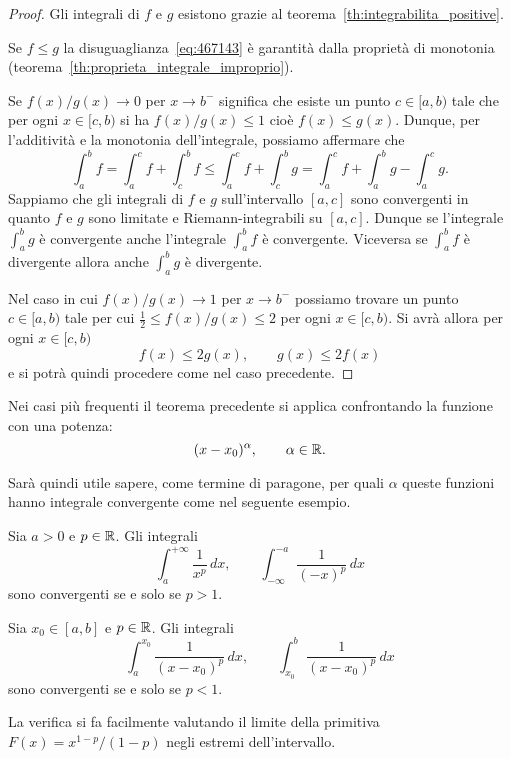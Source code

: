 \begin{proof}
\mymark{**}
Gli integrali di $f$ e $g$ esistono grazie al teorema~\ref{th:integrabilita_positive}.

Se $f\le g$ la disuguaglianza~\eqref{eq:467143} è garantità dalla proprietà di monotonia
(teorema~\ref{th:proprieta_integrale_improprio}).

Se $f(x)/g(x) \to 0$ per $x\to b^-$ significa che esiste un punto $c\in[a,b)$
tale che per ogni $x\in [c,b)$ si ha $f(x)/g(x)\le 1$ cioè $f(x)\le g(x)$.
Dunque, per l'additività e la monotonia dell'integrale, possiamo affermare che
\[
  \int_a^b f
  = \int_a^c f + \int_c^b f
  \le \int_a^c f + \int_c^b g
  = \int_a^c f + \int_a^b g - \int_a^c g.
\]
Sappiamo che gli integrali di $f$ e $g$ sull'intervallo
$[a,c]$ sono convergenti in quanto $f$ e $g$ sono
limitate e Riemann-integrabili su $[a,c]$.
Dunque se l'integrale $\int_a^b g$ è convergente anche l'integrale
$\int_a^b f$ è convergente.
Viceversa se $\int_a^b f$ è divergente allora anche $\int_a^b g$ è divergente.

Nel caso in cui $f(x)/g(x)\to 1$ per $x\to b^-$ possiamo trovare
un punto $c\in[a,b)$ tale per cui $\frac 1 2 \le f(x)/g(x) \le 2$
per ogni $x\in [c,b)$. Si avrà allora per ogni $x\in [c,b)$
\[
f(x) \le 2g(x), \qquad g(x) \le 2 f(x)
\]
e si potrà quindi procedere come nel caso precedente.
\end{proof}

Nei casi più frequenti il teorema precedente si applica confrontando la funzione con una potenza:
\[
  (x-x_0)^\alpha, \qquad \alpha \in \mathbb R.
\]

Sarà quindi utile sapere, come termine di paragone,
per quali $\alpha$ queste funzioni hanno integrale convergente
come nel seguente esempio.

\begin{example}
\label{ex:416145}%
\mymark{***}%
Sia $a>0$ e $p\in \mathbb R$. Gli integrali
\[
  \int_{a}^{+\infty}\frac{1}{x^p}\, dx,
  \qquad
  \int_{-\infty}^{-a}\frac{1}{(-x)^p}\, dx
\]
sono convergenti se e solo se $p>1$.

Sia $x_0\in [a,b]$ e $p\in\mathbb R$.
Gli integrali
\[
  \int_a^{x_0} \frac{1}{(x-x_0)^p}\, dx,
  \qquad
  \int_{x_0}^b \frac{1}{(x-x_0)^p}\, dx
\]
sono convergenti se e solo se $p<1$.

La verifica si fa facilmente valutando il limite della primitiva
$F(x) = x^{1-p}/(1-p)$ negli estremi dell'intervallo.
\end{example}

